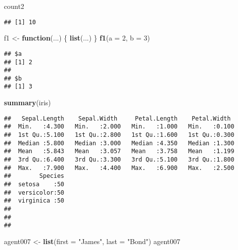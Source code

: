 \documentclass[]{article}
\newenvironment{Shaded}{\begin{snugshade}}{\end{snugshade}}
\newcommand{\ControlFlowTok}[1]{\textcolor[rgb]{0.13,0.29,0.53}{\textbf{#1}}}
\newcommand{\DataTypeTok}[1]{\textcolor[rgb]{0.13,0.29,0.53}{#1}}
\newcommand{\DecValTok}[1]{\textcolor[rgb]{0.00,0.00,0.81}{#1}}
\newcommand{\KeywordTok}[1]{\textcolor[rgb]{0.13,0.29,0.53}{\textbf{#1}}}
\newcommand{\NormalTok}[1]{#1}
\newcommand{\StringTok}[1]{\textcolor[rgb]{0.31,0.60,0.02}{#1}}
\begin{document}
\begin{Shaded}
\begin{Highlighting}[]
\NormalTok{count2}
\end{Highlighting}
\end{Shaded}

\begin{verbatim}
## [1] 10
\end{verbatim}

\begin{Shaded}
\begin{Highlighting}[]
\NormalTok{f1 <-}\StringTok{ }\ControlFlowTok{function}\NormalTok{(...) \{}
  \KeywordTok{list}\NormalTok{(...)}
\NormalTok{\}}
\KeywordTok{f1}\NormalTok{(}\DataTypeTok{a =} \DecValTok{2}\NormalTok{, }\DataTypeTok{b =} \DecValTok{3}\NormalTok{)}
\end{Highlighting}
\end{Shaded}

\begin{verbatim}
## $a
## [1] 2
## 
## $b
## [1] 3
\end{verbatim}

\begin{Shaded}
\begin{Highlighting}[]
\KeywordTok{summary}\NormalTok{(iris)}
\end{Highlighting}
\end{Shaded}

\begin{verbatim}
##   Sepal.Length    Sepal.Width     Petal.Length    Petal.Width   
##  Min.   :4.300   Min.   :2.000   Min.   :1.000   Min.   :0.100  
##  1st Qu.:5.100   1st Qu.:2.800   1st Qu.:1.600   1st Qu.:0.300  
##  Median :5.800   Median :3.000   Median :4.350   Median :1.300  
##  Mean   :5.843   Mean   :3.057   Mean   :3.758   Mean   :1.199  
##  3rd Qu.:6.400   3rd Qu.:3.300   3rd Qu.:5.100   3rd Qu.:1.800  
##  Max.   :7.900   Max.   :4.400   Max.   :6.900   Max.   :2.500  
##        Species  
##  setosa    :50  
##  versicolor:50  
##  virginica :50  
##                 
##                 
## 
\end{verbatim}

\begin{Shaded}
\begin{Highlighting}[]
\NormalTok{agent007 <-}\StringTok{ }\KeywordTok{list}\NormalTok{(}\DataTypeTok{first =} \StringTok{"James"}\NormalTok{, }\DataTypeTok{last =} \StringTok{"Bond"}\NormalTok{)}
\NormalTok{agent007}
\end{Highlighting}
\end{Shaded}
\end{document}
